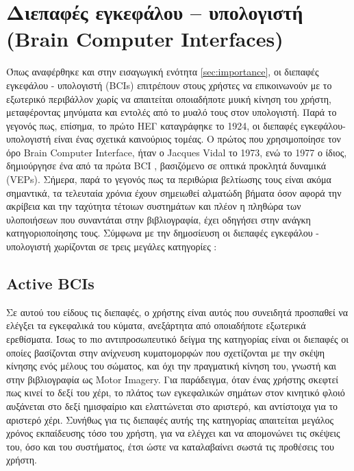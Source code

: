 \documentclass[11pt,a4paper,english,greek,twoside]{../Thesis}
\begin{document}
\section{Διεπαφές εγκεφάλου – υπολογιστή (Brain Computer Interfaces)}

  \par Όπως αναφέρθηκε και στην εισαγωγική ενότητα \ref{sec:importance}, οι διεπαφές εγκεφάλου - υπολογιστή (BCIs) επιτρέπουν στους χρήστες να επικοινωνούν με το εξωτερικό περιβάλλον χωρίς να απαιτείται οποιαδήποτε μυική κίνηση του χρήστη, μεταφέροντας μηνύματα και εντολές από το μυαλό τους στον υπολογιστή. Παρά το γεγονός πως, επίσημα, το πρώτο ΗΕΓ καταγράφηκε το 1924, οι διεπαφές εγκεφάλου-υπολογιστή είναι ένας σχετικά καινούριος τομέας. Ο πρώτος που χρησιμοποίησε τον όρο Brain Computer Interface, ήταν ο Jacques Vidal \cite{Vidal1973-xi} το 1973, ενώ το 1977 ο ίδιος, δημιούργησε ένα από τα πρώτα BCI \cite{Vidal1977-wi}, βασιζόμενο σε οπτικά προκλητά δυναμικά (VEPs). Σήμερα, παρά το γεγονός πως τα περιθώρια βελτίωσης τους είναι ακόμα σημαντικά, τα τελευταία χρόνια έχουν σημειωθεί αλματώδη βήματα όσον αφορά την ακρίβεια και την ταχύτητα τέτοιων συστημάτων και πλέον η πληθώρα των υλοποιήσεων που συναντάται στην βιβλιογραφία, έχει οδηγήσει στην ανάγκη κατηγοριοποίησης τους. Σύμφωνα με την δημοσίευση \cite{Zander2010-ji} οι διεπαφές εγκεφάλου - υπολογιστή χωρίζονται σε τρεις μεγάλες κατηγορίες : 
  \label{sec:bci_categories}
  \subsection{Active BCIs}
  \par Σε αυτού του είδους τις διεπαφές, ο χρήστης είναι αυτός που συνειδητά προσπαθεί να ελέγξει τα εγκεφαλικά του κύματα, ανεξάρτητα από οποιαδήποτε εξωτερικά ερεθίσματα. Ίσως το πιο αντιπροσωπευτικό δείγμα της κατηγορίας είναι οι διεπαφές οι οποίες βασίζονται στην ανίχνευση κυματομορφών που σχετίζονται με την σκέψη κίνησης ενός μέλους του σώματος, και όχι την πραγματική κίνηση του, γνωστή και στην βιβλιογραφία ως Motor Imagery. Για παράδειγμα, όταν ένας χρήστης σκεφτεί πως κινεί το δεξί του χέρι, το πλάτος των εγκεφαλικών σημάτων στον κινητικό φλοιό αυξάνεται στο δεξί ημισφαίριο και ελαττώνεται στο αριστερό, και αντίστοιχα για το αριστερό χέρι. Συνήθως για τις διεπαφές αυτής της κατηγορίας απαιτείται μεγάλος χρόνος εκπαίδευσης τόσο του χρήστη, για να ελέγχει και να απομονώνει τις σκέψεις του, όσο και του συστήματος, έτσι ώστε να καταλαβαίνει σωστά τις προθέσεις του χρήστη. 
\end{document}
